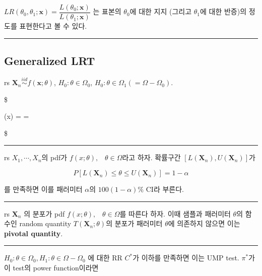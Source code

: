 \documentclass[
]{book}
\begin{document}
\(LR(\theta_0, \theta_1 ; \pmb x) = \dfrac{L(\theta_0 ; \pmb x)} {L(\theta_1 ; \pmb x)}\) 는 표본의 \(\theta_0\)에 대한 지지 (그리고 \(\theta_1\)에 대한 반증)의 정도를 표현한다고 볼 수 있다.

\begin{center}\rule{0.5\linewidth}{0.5pt}\end{center}

\hypertarget{generalized-lrt}{%
\subsection{Generalized LRT}\label{generalized-lrt}}

rs \(\pmb X_n \overset {iid}{\sim} f(\pmb x ; \theta)\), \(H_0: \theta \in \Omega_0\), \(H_0: \theta \in \Omega_1 (=\Omega - \Omega_0)\).

\$

\Lambda (\pmb x) =  = 

\$

\begin{center}\rule{0.5\linewidth}{0.5pt}\end{center}

rs \(X_1, \cdots, X_n\)의 pdf가 \(f(x ; \theta), \; \; \; \theta \in \Omega\)라고 하자. 확률구간 \(\left[ L(\pmb X_n ), U(\pmb X_n ) \right]\)가

\[
P \left[ L(\pmb X_n ) \le \theta \le U(\pmb X_n ) \right] = 1- \alpha
\]

를 만족하면 이를 패러미터 \(\alpha\)의 \(100(1-\alpha) \%\) CI라 부른다.

\begin{center}\rule{0.5\linewidth}{0.5pt}\end{center}

rs \(\pmb X_n\) 의 분포가 pdf \(f(x ; \theta), \; \; \; \theta \in \Omega\)를 따른다 하자. 이때 샘플과 패러미터 \(\theta\)의 함수인 random quantity \(T(\pmb X_n ; \theta)\)의 분포가 패러미터 \(\theta\)에 의존하지 않으면 이는 \textbf{pivotal quantity}.

\begin{center}\rule{0.5\linewidth}{0.5pt}\end{center}

\(H_0: \theta \in \Omega_0, H_1: \theta \in \Omega - \Omega_0\) 에 대한 RR \(C^\ast\)가 이하를 만족하면 이는 UMP test. \(\pi^\ast\)가 이 test의 power function이라면
\end{document}
